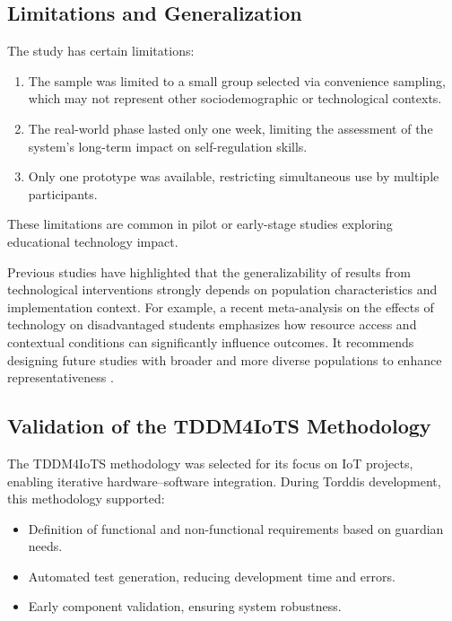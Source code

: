                 \subsection{Limitations and Generalization}
                The study has certain limitations:
                
                \begin{enumerate}
                    \item The sample was limited to a small group selected via convenience sampling, which may not represent other sociodemographic or technological contexts.
                    
                    \item The real-world phase lasted only one week, limiting the assessment of the system’s long-term impact on self-regulation skills.
                    
                    \item Only one prototype was available, restricting simultaneous use by multiple participants.
                \end{enumerate}
                
                These limitations are common in pilot or early-stage studies exploring educational technology impact.
                
                Previous studies have highlighted that the generalizability of results from technological interventions strongly depends on population characteristics and implementation context. For example, a recent meta-analysis on the effects of technology on disadvantaged students emphasizes how resource access and contextual conditions can significantly influence outcomes. It recommends designing future studies with broader and more diverse populations to enhance representativeness \citep{DiPietro2025Meta}.
                
                \subsection{Validation of the TDDM4IoTS Methodology}
                The TDDM4IoTS methodology \citep{Guerrero-Ulloa2020TDDM4IoTS} was selected for its focus on IoT projects, enabling iterative hardware–software integration. During Torddis development, this methodology supported:
                
                \begin{itemize}
                    \item Definition of functional and non-functional requirements based on guardian needs.
                    
                    \item Automated test generation, reducing development time and errors.
                    
                    \item Early component validation, ensuring system robustness.
                \end{itemize}
                

